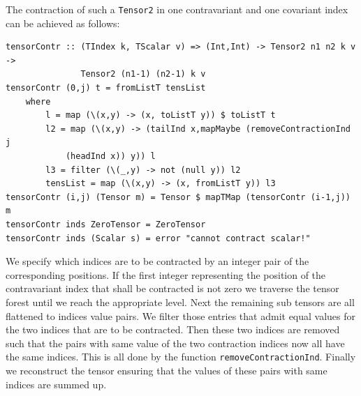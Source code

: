 \documentclass[a4paper,12pt, DIV=14, BCOR=5mm, twoside, headsepline]{scrbook}
\begin{document}
The contraction of such a \texttt{Tensor2} in one contravariant and one covariant index can be achieved as follows:

\begin{samepage} 
\begin{verbatim}
tensorContr :: (TIndex k, TScalar v) => (Int,Int) -> Tensor2 n1 n2 k v ->
               Tensor2 (n1-1) (n2-1) k v 
tensorContr (0,j) t = fromListT tensList 
    where
        l = map (\(x,y) -> (x, toListT y)) $ toListT t
        l2 = map (\(x,y) -> (tailInd x,mapMaybe (removeContractionInd j
            (headInd x)) y)) l
        l3 = filter (\(_,y) -> not (null y)) l2 
        tensList = map (\(x,y) -> (x, fromListT y)) l3
tensorContr (i,j) (Tensor m) = Tensor $ mapTMap (tensorContr (i-1,j)) m
tensorContr inds ZeroTensor = ZeroTensor 
tensorContr inds (Scalar s) = error "cannot contract scalar!"
\end{verbatim} 
\end{samepage}

We specify which indices are to be contracted by an integer pair of the corresponding positions. If the first integer representing the position of the  contravariant index that shall be contracted is not zero we traverse the tensor forest until we reach the appropriate level. Next the remaining sub tensors are all flattened to indices value pairs. We filter those entries that admit equal values for the two indices that are to be contracted. Then these two indices are removed such that the pairs with same value of the two contraction indices now all have the same indices. This is all done by the function \texttt{removeContractionInd}. Finally we reconstruct the tensor ensuring that the values of these pairs with same indices are summed up. \\
\end{document}
